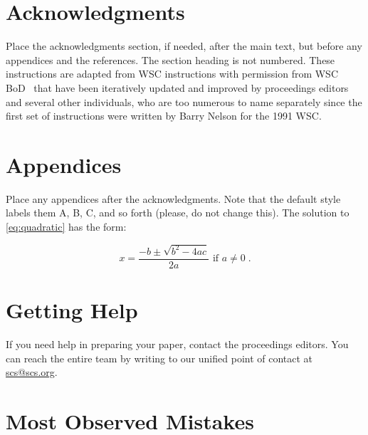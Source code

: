 \documentclass{scspaperproc}
\theoremstyle{scsthe}
\begin{document}
\section*{Acknowledgments}
Place the acknowledgments section, if needed, after the main text, but before any appendices and the references. The section heading is not numbered. These instructions are adapted from WSC instructions with permission from WSC BoD~\cite{WSC} that have been iteratively updated and improved by proceedings editors and several other individuals, who are too numerous to name separately since the first set of instructions were written by Barry Nelson for the 1991 WSC.

\appendix

\section{Appendices} \label{app:quadratic}
Place any appendices after the acknowledgments. Note that the default style labels them A, B, C, and so forth (please, do not change this). 
The solution to \eqref{eq:quadratic} has the form:

\begin{equation} \label{eq:quadratic sol}
x = \frac{-b \pm \sqrt{b^2-4ac}}{2a} \mbox{ if } a \ne 0\;.
\end{equation}


\section{Getting Help}
If you need help in preparing your paper, contact the proceedings editors. You can reach the entire team by writing to our unified point of contact at \href{mailto://scs@scs.org}{scs@scs.org}. 


\section{Most Observed Mistakes}
\end{document}
